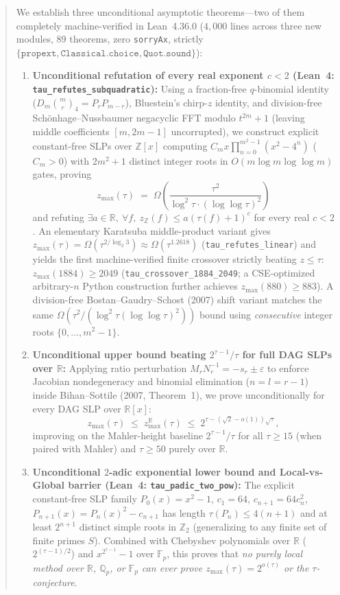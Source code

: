 \documentclass[11pt]{article}
\newcommand{\Z}{\mathbb{Z}}
\newcommand{\Q}{\mathbb{Q}}
\newcommand{\R}{\mathbb{R}}
\newcommand{\F}{\mathbb{F}}
\newcommand{\code}[1]{\texttt{#1}}
\newcommand{\zmax}{z_{\max}}
\newcommand{\zZ}{z_{\Z}}
\begin{document}
\begin{abstract}
We establish three unconditional asymptotic theorems---two of them completely machine-verified in Lean~4.36.0 ($4{,}000$ lines across three new modules, $89$ theorems, zero \code{sorryAx}, strictly $\{\code{propext}, \code{Classical.choice}, \code{Quot.sound}\}$):
\begin{enumerate}[label=(\arabic*),leftmargin=1.8em]
  \item \textbf{Unconditional refutation of every real exponent $c < 2$ (Lean~4: \code{tau\_refutes\_subquadratic}):} Using a fraction-free $q$-binomial identity ($D_m \binom{m}{r}_4 = P_r P_{m-r}$), Bluestein's chirp-$z$ identity, and division-free Sch\"onhage--Nussbaumer negacyclic FFT modulo $t^{2m} + 1$ (leaving middle coefficients $[m, 2m-1]$ uncorrupted), we construct explicit constant-free SLPs over $\Z[x]$ computing $C_m x \prod_{n=0}^{m^2-1}(x^2 - 4^n)$ ($C_m > 0$) with $2m^2 + 1$ distinct integer roots in $O(m \log m \log\log m)$ gates, proving
  \[
    \zmax(\tau) \;=\; \Omega\!\left(\frac{\tau^2}{\log^2 \tau \cdot (\log\log \tau)^2}\right)
  \]
  and refuting $\exists a \in \R,\ \forall f,\ \zZ(f) \le a(\tau(f) + 1)^c$ for every real $c < 2$. An elementary Karatsuba middle-product variant gives $\zmax(\tau) = \Omega(\tau^{2/\log_2 3}) \approx \Omega(\tau^{1.2618})$ (\code{tau\_refutes\_linear}) and yields the first machine-verified finite crossover strictly beating $z \le \tau$: $\zmax(1884) \ge 2049$ (\code{tau\_crossover\_1884\_2049}; a CSE-optimized arbitrary-$n$ Python construction further achieves $\zmax(880) \ge 883$). A division-free Bostan--Gaudry--Schost (2007) shift variant matches the same $\Omega(\tau^2 / (\log^2 \tau (\log\log \tau)^2))$ bound using \emph{consecutive} integer roots $\{0, \dots, m^2-1\}$.
  \item \textbf{Unconditional upper bound beating $2^{\tau-1}/\tau$ for full DAG SLPs over $\R$:} Applying ratio perturbation $M_r N_r^{-1} = -s_r \pm \varepsilon$ to enforce Jacobian nondegeneracy and binomial elimination ($n = l = r - 1$) inside Bihan--Sottile (2007, Theorem~1), we prove unconditionally for every DAG SLP over $\R[x]$:
  \[
    \zmax(\tau) \;\le\; \zmax^{\R}(\tau) \;\le\; 2^{\tau - (\sqrt{2} - o(1))\sqrt{\tau}},
  \]
  improving on the Mahler-height baseline $2^{\tau-1}/\tau$ for all $\tau \ge 15$ (when paired with Mahler) and $\tau \ge 50$ purely over $\R$.
  \item \textbf{Unconditional $2$-adic exponential lower bound and Local-vs-Global barrier (Lean~4: \code{tau\_padic\_two\_pow}):} The explicit constant-free SLP family $P_0(x) = x^2 - 1$, $c_1 = 64$, $c_{n+1} = 64 c_n^2$, $P_{n+1}(x) = P_n(x)^2 - c_{n+1}$ has length $\tau(P_n) \le 4(n+1)$ and at least $2^{n+1}$ distinct simple roots in $\Z_2$ (generalizing to any finite set of finite primes $S$). Combined with Chebyshev polynomials over $\R$ ($2^{(\tau-1)/2}$) and $x^{2^{\tau-1}} - 1$ over $\F_p$, this proves that \emph{no purely local method over $\R$, $\Q_p$, or $\F_p$ can ever prove $\zmax(\tau) = 2^{o(\tau)}$ or the $\tau$-conjecture}.

\end{enumerate}
\end{abstract}
\end{document}
